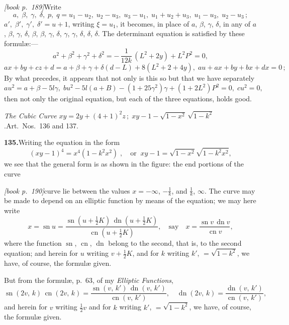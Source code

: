 \documentclass[11pt,a4paper]{article}
\DeclareMathOperator{\sn}{sn}
\DeclareMathOperator{\cn}{cn}
\DeclareMathOperator{\dn}{dn}
\begin{document}
\medskip\noindent\textit{[book p.~189]}\quad Write
\[
a,\;\beta,\;\gamma,\;\delta,\;p,\;q = u_1 - u_2,\;u_2 - u_3,\;u_3 - u_1,\;u_1 + u_2 + u_3,\;u_1 - u_3,\;u_2 - u_3\,;
\]
$a',\;\beta',\;\gamma',\;\delta' = u + 1$, writing $\xi = u_1$, it becomes, in place of $a$, $\beta$, $\gamma$, $\delta$, in any of $a$, $\beta$, $\gamma$, $\delta$, $\beta$, $\beta$, $\gamma$, $\delta$, $\gamma$, $\gamma$, $\delta$, $\delta$, $\delta$. The determinant equation is satisfied by these formul\ae{}:---
\[
a^2 + \beta^2 + \gamma^2 + \delta^2 = -\,\frac{1}{12k}\,(L^2 + 2y) + L^2 P^2 = 0,
\]
\[
ax + by + cz + d = a + \beta + \gamma + \delta(d - L) + 8(L^2 + 2 + 4y),\;a u + a x + b y + b x + d x = 0\,;
\]
By what precedes, it appears that not only is this so but that we have separately
\[
a u^2 = a + \beta - 5l\gamma,\;b u^2 - 5l(a + B) - (1 + 25\gamma^2)\gamma + (1 + 2L^2)P^2 = 0,\;c u^2 = 0,
\]
then not only the original equation, but each of the three equations, holds good.

\medskip\noindent\textit{The Cubic Curve} $xy = 2y + (4 + 1)^2 z\,;\;xy - 1 - \sqrt{1 - x^2}$\,$\sqrt{1 - k^2}$.\quad Art.\ Nos.\ 136 and 137.

\medskip\noindent\textbf{135.}\quad Writing the equation in the form
\[
(xy - 1)^4 = x^4(1 - k^2 x^2)\;,\quad\text{or}\;\;xy - 1 = \sqrt{1 - x^2}\sqrt{1 - k^2 x^2},
\]
we see that the general form is as shown in the figure: the end portions of the curve

\medskip\noindent\textit{[book p.~190]}\quad curve lie between the values $x = -\infty$, $-\frac{1}{k}$, and $\frac{1}{k}$, $\infty$. The curve may be made to depend on an elliptic function by means of the equation; we may here write
\[
x = \sn u = \frac{\sn(u + \tfrac{1}{2}K)\,\dn(u + \tfrac{1}{2}K)}{\cn(u + \tfrac{1}{2}K)}, \quad\text{say}\quad x = \frac{\sn v\,\dn v}{\cn v},
\]
where the function $\sn$, $\cn$, $\dn$ belong to the second, that is, to the second equation; and herein for $u$ writing $v + \tfrac{1}{2}K$, and for $k$ writing $k'$, $= \sqrt{1 - k^2}$, we have, of course, the formul\ae{} given.

But from the formul\ae{}, p.\ $63$, of my \textit{Elliptic Functions},
\[
\sn(2v,\,k)\,\cn(2v,\,k) = \frac{\sn(v,\,k')\,\dn(v,\,k')}{\cn(v,\,k')},\quad \dn(2v,\,k) = \frac{\dn(v,\,k')}{\cn(v,\,k')},
\]
and herein for $v$ writing $\tfrac{1}{2}v$ and for $k$ writing $k'$, $= \sqrt{1 - k^2}$, we have, of course, the formul\ae{} given.
\end{document}
